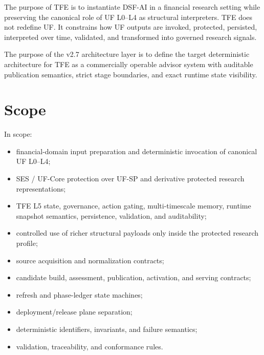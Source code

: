 The purpose of TFE is to instantiate DSF-AI in a financial research setting while preserving the canonical role of UF L0--L4 as structural interpreters. TFE does not redefine UF. It constrains how UF outputs are invoked, protected, persisted, interpreted over time, validated, and transformed into governed research signals.

The purpose of the v2.7 architecture layer is to define the target deterministic architecture for TFE as a commercially operable advisor system with auditable publication semantics, strict stage boundaries, and exact runtime state visibility.

\section{Scope}

In scope:
\begin{itemize}
    \item financial-domain input preparation and deterministic invocation of canonical UF L0--L4;
    \item SES / UF-Core protection over UF-SP and derivative protected research representations;
    \item TFE L5 state, governance, action gating, multi-timescale memory, runtime snapshot semantics, persistence, validation, and auditability;
    \item controlled use of richer structural payloads only inside the protected research profile;
    \item source acquisition and normalization contracts;
    \item candidate build, assessment, publication, activation, and serving contracts;
    \item refresh and phase-ledger state machines;
    \item deployment/release plane separation;
    \item deterministic identifiers, invariants, and failure semantics;
    \item validation, traceability, and conformance rules.
\end{itemize}

